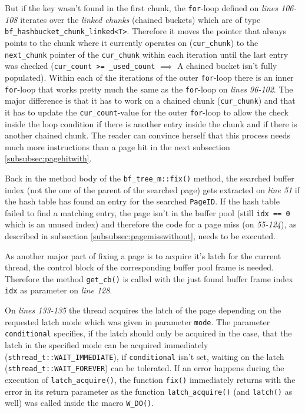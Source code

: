 	But if the key wasn't found in the first chunk, the \lstinline{for}-loop defined on \emph{lines 106-108} iterates over the \emph{linked chunks} (chained buckets) which are of type \lstinline{bf_hashbucket_chunk_linked<T>}. Therefore it moves the pointer that always points to the chunk where it currently operates on (\lstinline{cur_chunk}) to the \lstinline{next_chunk} pointer of the \lstinline{cur_chunk} within each iteration until the last entry was checked (\lstinline{cur_count >= _used_count} $\implies$ A chained bucket isn't fully populated). Within each of the iterations of the outer \lstinline{for}-loop there is an inner \lstinline{for}-loop that works pretty much the same as the \lstinline{for}-loop on \emph{lines 96-102}. The major difference is that it has to work on a chained chunk (\lstinline{cur_chunk}) and that it has to update the \lstinline{cur_count}-value for the outer \lstinline{for}-loop to allow the check inside the loop condition if there is another entry inside the chunk and if there is another chained chunk. The reader can convince herself that this process needs much more instructions than a page hit in the next subsection \ref{subsubsec:pagehitwith}.

	Back in the method body of the \lstinline{bf_tree_m::fix()} method, the searched buffer index (not the one of the parent of the searched page) gets extracted on \emph{line 51} if the hash table has found an entry for the searched \lstinline{PageID}. If the hash table failed to find a matching entry, the page isn't in the buffer pool (still \lstinline{idx == 0} which is an unused index) and therefore the code for a page miss (on \emph{55-124}), as described in subsection \ref{subsubsec:pagemisswithout}, needs to be executed.

	As another major part of fixing a page is to acquire it's latch for the current thread, the control block of the corresponding buffer pool frame is needed. Therefore the method \lstinline{get_cb()} is called with the just found buffer frame index \lstinline{idx} as parameter on \emph{line 128}.

	On \emph{lines 133-135} the thread acquires the latch of the page depending on the requested latch mode which was given in parameter \lstinline{mode}. The parameter \lstinline{conditional} specifies, if the latch should only be acquired in the case, that the latch in the specified mode can be acquired immediately (\lstinline{sthread_t::WAIT_IMMEDIATE}), if \lstinline{conditional} isn't set, waiting on the latch (\lstinline{sthread_t::WAIT_FOREVER}) can be tolerated. If an error happens during the execution of \lstinline{latch_acquire()}, the function \lstinline{fix()} immediately returns with the error in its return parameter as the function \lstinline{latch_acquire()} (and \lstinline{latch()} as well) was called inside the macro \lstinline{W_DO()}.

